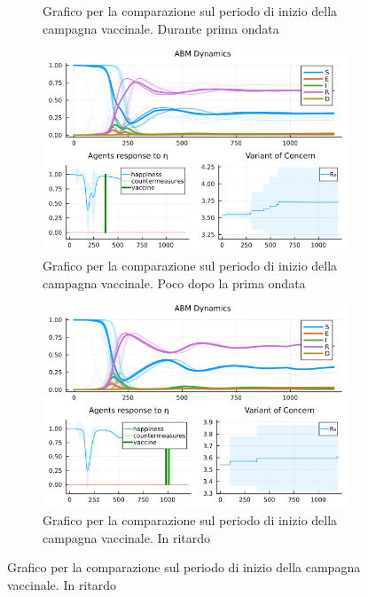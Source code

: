 \begin{figure}[H]
\begin{subfigure}[b]{0.45\textwidth}
		\caption{Grafico per la comparazione sul periodo di inizio della campagna vaccinale. Durante prima ondata}
		\label{fig:comparison_vax_2}
	\end{subfigure}
	\hfill
	\begin{subfigure}[b]{0.45\textwidth}
		\centering
		\includegraphics[width=\textwidth]{img/SocialNetworkABM_3_V.png}
		\caption{Grafico per la comparazione sul periodo di inizio della campagna vaccinale. Poco dopo la prima ondata}
		\label{fig:comparison_vax_3}
	\end{subfigure}
	\hfill
	\begin{subfigure}[b]{0.45\textwidth}
		\centering
		\includegraphics[width=\textwidth]{img/SocialNetworkABM_5_V.png}
		\caption{Grafico per la comparazione sul periodo di inizio della campagna vaccinale. In ritardo}
		\label{fig:comparison_vax_4}
	\end{subfigure}
\end{figure}

